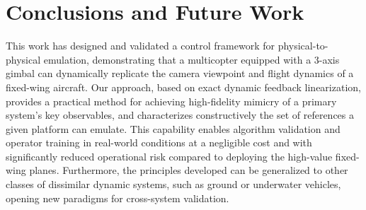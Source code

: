 \documentclass[letterpaper, 10 pt, conference]{ieeeconf}  %
\begin{document}













\section{Conclusions and Future Work}
\label{sec:conclusions}



This work has designed and validated a control framework for physical-to-physical emulation, demonstrating that a multicopter equipped with a 3-axis gimbal can dynamically replicate the camera viewpoint and flight dynamics of a fixed-wing aircraft. Our approach, based on exact dynamic feedback linearization, provides a practical method for achieving high-fidelity mimicry of a primary system's key observables, and characterizes constructively the set of references a given platform can emulate. This capability enables algorithm validation and operator training in real-world conditions at a negligible cost and with significantly reduced operational risk compared to deploying the high-value fixed-wing planes. Furthermore, the principles developed can be generalized to other classes of dissimilar dynamic systems, such as ground or underwater vehicles, opening new paradigms for cross-system validation.
\end{document}
